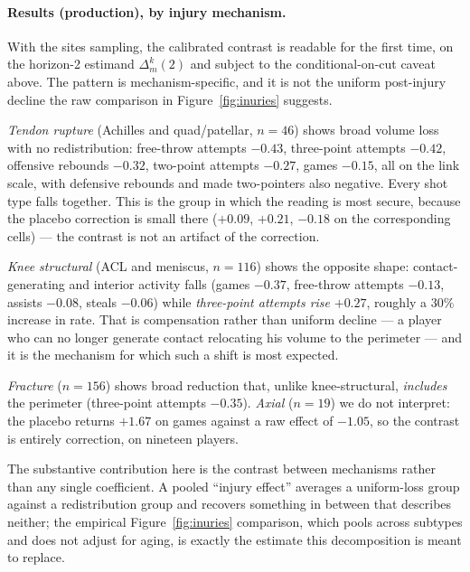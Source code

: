 \paragraph{Results (production), by injury mechanism.}  With the sites sampling, the calibrated contrast is readable for the first time, on the horizon-2 estimand $\Delta^k_m(2)$ and subject to the conditional-on-cut caveat above.  The pattern is mechanism-specific, and it is not the uniform post-injury decline the raw comparison in Figure~\ref{fig:inuries} suggests.

\emph{Tendon rupture} (Achilles and quad/patellar, $n=46$) shows broad volume loss with no redistribution: free-throw attempts $-0.43$, three-point attempts $-0.42$, offensive rebounds $-0.32$, two-point attempts $-0.27$, games $-0.15$, all on the link scale, with defensive rebounds and made two-pointers also negative.  Every shot type falls together.  This is the group in which the reading is most secure, because the placebo correction is small there ($+0.09$, $+0.21$, $-0.18$ on the corresponding cells) --- the contrast is not an artifact of the correction.

\emph{Knee structural} (ACL and meniscus, $n=116$) shows the opposite shape: contact-generating and interior activity falls (games $-0.37$, free-throw attempts $-0.13$, assists $-0.08$, steals $-0.06$) while \emph{three-point attempts rise} $+0.27$, roughly a $30\%$ increase in rate.  That is compensation rather than uniform decline --- a player who can no longer generate contact relocating his volume to the perimeter --- and it is the mechanism for which such a shift is most expected.

\emph{Fracture} ($n=156$) shows broad reduction that, unlike knee-structural, \emph{includes} the perimeter (three-point attempts $-0.35$).  \emph{Axial} ($n=19$) we do not interpret: the placebo returns $+1.67$ on games against a raw effect of $-1.05$, so the contrast is entirely correction, on nineteen players.

The substantive contribution here is the contrast between mechanisms rather than any single coefficient.  A pooled ``injury effect'' averages a uniform-loss group against a redistribution group and recovers something in between that describes neither; the empirical Figure~\ref{fig:inuries} comparison, which pools across subtypes and does not adjust for aging, is exactly the estimate this decomposition is meant to replace.


